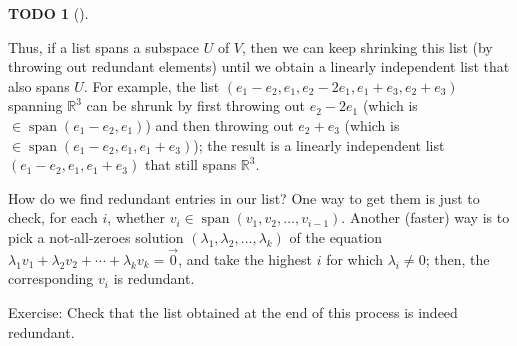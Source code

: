 \documentclass[numbers=enddot,12pt,final,onecolumn,notitlepage]{scrartcl}%
\theoremstyle{definition}
\newtheorem{quest}[theo]{TODO}
\newenvironment{todo}[1][]
{\begin{quest}[#1]\begin{leftbar}}
{\end{leftbar}\end{quest}}
\begin{document}
\begin{todo}
Thus, if a list spans a subspace $U$ of $V$, then we can keep shrinking this
list (by throwing out redundant elements) until we obtain a linearly
independent list that also spans $U$. For example, the list $\left(
e_{1}-e_{2},e_{1},e_{2}-2e_{1},e_{1}+e_{3},e_{2}+e_{3}\right)  $ spanning
$\mathbb{R}^{3}$ can be shrunk by first throwing out $e_{2}-2e_{1}$ (which is
$\in\operatorname*{span}\left(  e_{1}-e_{2},e_{1}\right)  $) and then throwing
out $e_{2}+e_{3}$ (which is $\in\operatorname*{span}\left(  e_{1}-e_{2}%
,e_{1},e_{1}+e_{3}\right)  $); the result is a linearly independent list
$\left(  e_{1}-e_{2},e_{1},e_{1}+e_{3}\right)  $ that still spans
$\mathbb{R}^{3}$.

How do we find redundant entries in our list? One way to get them is just to
check, for each $i$, whether $v_{i}\in\operatorname*{span}\left(  v_{1}%
,v_{2},\ldots,v_{i-1}\right)  $. Another (faster) way is to pick a
not-all-zeroes solution $\left(  \lambda_{1},\lambda_{2},\ldots,\lambda
_{k}\right)  $ of the equation $\lambda_{1}v_{1}+\lambda_{2}v_{2}%
+\cdots+\lambda_{k}v_{k}=\overrightarrow{0}$, and take the highest $i$ for
which $\lambda_{i}\neq0$; then, the corresponding $v_{i}$ is redundant.

Exercise: Check that the list obtained at the end of this process is indeed redundant.
\end{todo}
\end{document}
